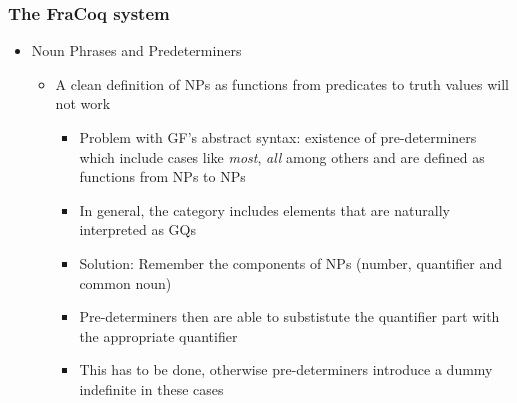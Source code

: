\documentclass[11pt]{beamer}
\begin{document}
\begin{frame}[fragile]
	\frametitle{The FraCoq system}
	
	\begin{itemize}
		
		\item Noun Phrases and Predeterminers
		
		
	\begin{itemize}
		
		\item A clean definition of NPs as functions from predicates to truth values will not work
		
			\begin{itemize}
				
				\item	Problem with GF's abstract syntax: existence of pre-determiners which include cases like \textit{most}, \textit{all} among others and are defined as functions from NPs to NPs
				
				\item In general, the category includes elements that are naturally interpreted as GQs
				
				\item Solution: Remember the components of NPs (number, quantifier and common noun)
				
				\item Pre-determiners then are able to substistute the quantifier part with the appropriate quantifier
				
				\item This has to be done, otherwise pre-determiners introduce a dummy indefinite in these cases
		
\end{itemize}\end{itemize}\end{itemize}
\end{frame}		
\end{document}
